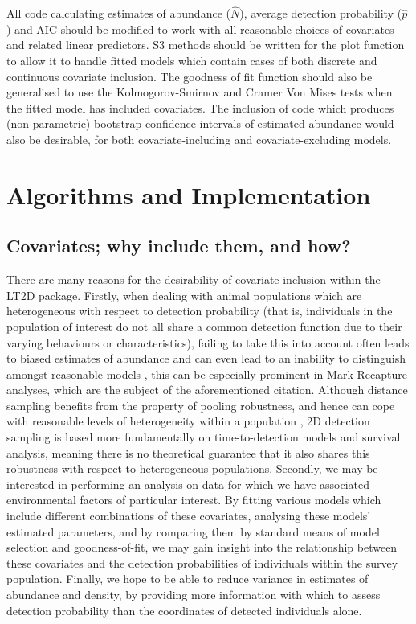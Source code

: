 \documentclass[11pt]{article}
\begin{document}
\begin{multicols}{2}
All code calculating estimates of abundance ($\hat{N}$), average detection probability ($\hat{p}$) and AIC should be modified to work with all reasonable choices of covariates and related linear predictors. S3 methods should be written for the plot function to allow it to handle fitted models which contain cases of both discrete and continuous covariate inclusion. The goodness of fit function should also be generalised to use the Kolmogorov-Smirnov and Cramer Von Mises tests when the fitted model has included covariates. The inclusion of code which produces (non-parametric) bootstrap confidence intervals of estimated abundance would also be desirable, for both covariate-including and covariate-excluding models.

\section{Algorithms and Implementation}
\subsection{Covariates; why include them, and how?}
There are many reasons for the desirability of covariate inclusion within the LT2D package. Firstly, when dealing with animal populations which are heterogeneous with respect to detection probability (that is, individuals in the population of interest do not all share a common detection function due to their varying behaviours or characteristics), failing to take this into account often leads to biased estimates of abundance and can even lead to an inability to distinguish amongst reasonable models \cite{Link}, this can be especially prominent in Mark-Recapture analyses, which are the subject of the aforementioned citation. Although distance sampling benefits from the property of pooling robustness, and hence can cope with reasonable levels of heterogeneity within a population \cite{Buckland2004}, 2D detection sampling is based more fundamentally on time-to-detection models and survival analysis, meaning there is no theoretical guarantee that it also shares this robustness with respect to heterogeneous populations. Secondly, we may be interested in performing an analysis on data for which we have associated environmental factors of particular interest. By fitting various models which include different combinations of these covariates, analysing these models' estimated parameters, and by comparing them by standard means of model selection and goodness-of-fit, we may gain insight into the relationship between these covariates and the detection probabilities of individuals within the survey population. Finally, we hope to be able to reduce variance in estimates of abundance and density, by providing more information with which to assess detection probability than the coordinates of detected individuals alone.


\end{multicols}
\end{document}
